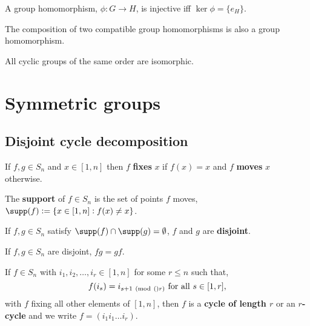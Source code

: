 \documentclass[../Year1/Year1.tex]{subfiles}
\begin{document}
\begin{lemma}
    A group homomorphism, $\phi:G\rightarrow H$, is injective iff $\ker\phi=\{e_H\}$.
\end{lemma}

\begin{theorem}
    The composition of two compatible group homomorphisms is also a group homomorphism.
\end{theorem}

\begin{theorem}
    All cyclic groups of the same order are isomorphic.
\end{theorem}

\section{Symmetric groups}

\subsection{Disjoint cycle decomposition}

\begin{definition}
    If $f,g\in S_n$ and $x\in[1,n]$ then $f$ \textbf{fixes} $x$ if $f(x)=x$ and $f$ \textbf{moves} $x$ otherwise. 
\end{definition}

\begin{definition}
    The \textbf{support} of $f\in S_n$ is the set of points $f$ moves, $\supp(f):=\{x\in[1,n]:f(x)\neq x\}$.
\end{definition}

\begin{definition}
    If $f,g\in S_n$ satisfy $\supp(f)\cap\supp(g)=\emptyset$, $f$ and $g$ are \textbf{disjoint}.
\end{definition}

\begin{lemma}
    If $f,g\in S_n$ are disjoint, $fg=gf$.
\end{lemma}

\begin{definition}[Cycles]
    If $f\in S_n$ with $i_1,i_2,\ldots,i_r\in[1,n]$ for some $r\leq n$ such that, \[
        f(i_s) = i_{s+1 \mod(r)} \ \text{\textcolor{black}{for all }} s\in[1,r]
    \textcolor{black}{,}
    \] with $f$ fixing all other elements of $[1,n]$, then $f$ is a \textbf{cycle of length $r$} or an \textbf{$r$-cycle} and we write $f=(i_1i_1\ldots i_r)$.
\end{definition}
\end{document}
